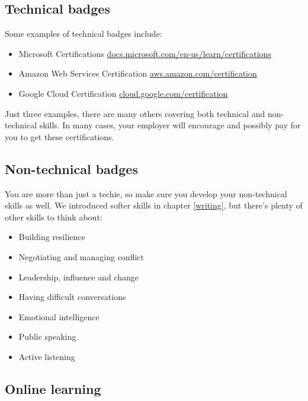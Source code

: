 \documentclass[
]{book}
\providecommand{\tightlist}{%
  \setlength{\itemsep}{0pt}\setlength{\parskip}{0pt}}
\begin{document}
\hypertarget{techie}{%
\subsection{Technical badges}\label{techie}}

Some examples of technical badges include:

\begin{itemize}
\tightlist
\item
  Microsoft Certifications \href{https://docs.microsoft.com/en-us/learn/certifications/}{docs.microsoft.com/en-us/learn/certifications}
\item
  Amazon Web Services Certification \href{https://aws.amazon.com/certification/}{aws.amazon.com/certification}
\item
  Google Cloud Certification \href{https://cloud.google.com/certification}{cloud.google.com/certification}
\end{itemize}

Just three examples, there are many others covering both technical and non-technical skills. In many cases, your employer will encourage and possibly pay for you to get these certifications.

\hypertarget{techieplusplus}{%
\subsection{Non-technical badges}\label{techieplusplus}}

You are more than just a techie, so make sure you develop your non-technical skills as well. We introduced softer skills in chapter \ref{writing}, but there's plenty of other skills to think about:

\begin{itemize}
\tightlist
\item
  Building resilience
\item
  Negotiating and managing conflict
\item
  Leadership, influence and change
\item
  Having difficult conversations
\item
  Emotional intelligence
\item
  Public speaking
\item
  Active listening
\end{itemize}

\hypertarget{mooc}{%
\subsection{Online learning}\label{mooc}}
\end{document}
